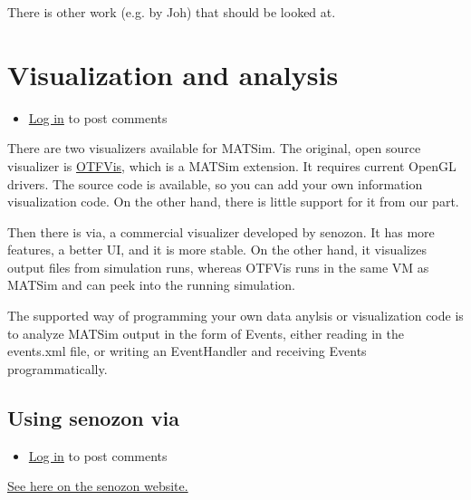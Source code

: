 \documentclass[a4paper,11pt]{report}
\begin{document}
There is other work (e.g. by Joh) that should be looked at.

\chapter{Visualization and analysis}
\begin{itemize}
	\item \href{http://www.matsim.org/user/login?destination=comment/reply/741%23comment-form}{Log in} to post comments
\end{itemize}

There are two visualizers available for MATSim. The original, open source visualizer is \href{http://matsim.org/docs/extensions/otfvis}{OTFVis},  which is a MATSim extension. It requires current OpenGL drivers. The  source code is available, so you can add your own information  visualization code. On the other hand, there is little support for it  from our part.

Then there is via, a commercial visualizer developed by senozon. It  has more features, a better UI, and it is more stable. On the other  hand, it visualizes output files from simulation runs, whereas OTFVis  runs in the same VM as MATSim and can peek into the running simulation.

The supported way of programming your own data anylsis or  visualization code is to analyze MATSim output in the form of Events,  either reading in the events.xml file, or writing an EventHandler and  receiving Events programmatically.

\vfill\eject
\section{Using senozon via}
\begin{itemize}
	\item \href{http://www.matsim.org/user/login?destination=comment/reply/742%23comment-form}{Log in} to post comments
\end{itemize}



\href{http://senozon.com/products/via}{See here on the senozon website.}
\end{document}
